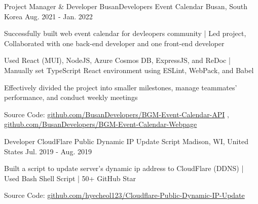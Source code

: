 

\begin{cventries}

  \cventry
  {Project Manager \& Developer} %
  {BusanDevelopers Event Calendar} %
  {Busan, South Korea} %
  {Aug. 2021 - Jan. 2022} %
  {
    \begin{cvitems} %
      \item {Successfully built web event calendar for devleopers community | Led project, Collaborated with one back-end developer and one front-end developer}
      \item {Used React (MUI), NodeJS, Azure Cosmos DB, ExpressJS, and ReDoc | Manually set TypeScript React environment using ESLint, WebPack, and Babel}
      \item {Effectively divided the project into smaller milestones, manage teammates' performance, and conduct weekly meetings}
      \item {
                  \color{text} Source Code: \color{awesome}\underline{github.com/BusanDevelopers/BGM-Event-Calendar-API} \color{text}, \color{awesome}\underline{github.com/BusanDevelopers/BGM-Event-Calendar-Webpage}
            }
    \end{cvitems}
  }

  \cventry
  {Developer} %
  {CloudFlare Public Dynamic IP Update Script} %
  {Madison, WI, United States} %
  {Jul. 2019 - Aug. 2019} %
  {
    \begin{cvitems} %
      \item {Built a script to update server's dynamic ip address to CloudFlare (DDNS) | Used Bash Shell Script | 50+ GitHub Star}
      \item {Source Code: \color{awesome}\underline{github.com/hyecheol123/Cloudflare-Public-Dynamic-IP-Update}}
    \end{cvitems}
  }

\end{cventries}
